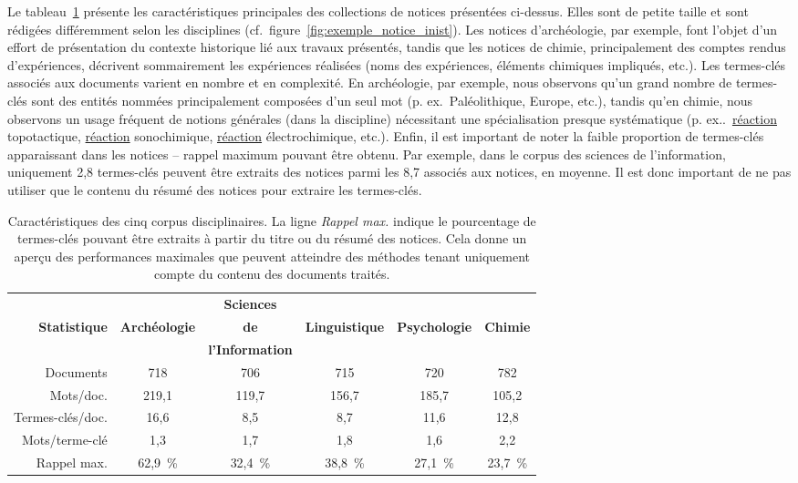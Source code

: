     Le tableau~\ref{tab:statistiques_des_corpus} présente les caractéristiques
    principales des collections de notices présentées ci-dessus. Elles sont de
    petite taille et sont rédigées différemment selon les disciplines
    (cf.~figure~\ref{fig:exemple_notice_inist}). Les notices d'archéologie, par
    exemple, font l'objet d'un effort de présentation du contexte historique lié
    aux travaux présentés, tandis que les notices de chimie, principalement des
    comptes rendus d'expériences, décrivent sommairement les expériences
    réalisées (noms des expériences, éléments chimiques impliqués, etc.). Les
    termes-clés associés aux documents varient en nombre et en complexité. En
    archéologie, par exemple, nous observons qu'un grand nombre de termes-clés
    sont des entités nommées principalement composées d'un seul mot
    (p. ex.~\og{}Paléolithique\fg{}, \og{}Europe\fg{}, etc.), tandis qu'en
    chimie, nous observons un usage fréquent de notions générales (dans la
    discipline) nécessitant une spécialisation presque systématique
    (p. ex..~\og{}\underline{réaction} topotactique\fg{},
    \og{}\underline{réaction} sonochimique\fg{}, \og{}\underline{réaction}
    électrochimique\fg{}, etc.). Enfin, il est important de noter la faible
    proportion de termes-clés apparaissant dans les notices -- rappel maximum
    pouvant être obtenu. Par exemple, dans le corpus des sciences de
    l'information, uniquement 2,8 termes-clés peuvent être extraits des notices
    parmi les 8,7 associés aux notices, en moyenne. Il est donc important de ne
    pas utiliser que le contenu du résumé des notices pour extraire les
    termes-clés.

    \begin{table}
      \centering
      \begin{tabular}{@{~}r|c@{~~}c@{~~}c@{~~}c@{~~}c@{~}}
        \toprule
        & & \textbf{Sciences} & & &\\ \textbf{Statistique} & \textbf{Archéologie} & \textbf{de} & \textbf{Linguistique} & \textbf{Psychologie} & \textbf{Chimie}\\ & & \textbf{l'Information} & & &\\
        \hline
        Documents & 718 & 706 & 715 & 720 & 782\\
        Mots/doc. & 219,1 & 119,7 & 156,7 & 185,7 & 105,2\\
        Termes-clés/doc. & 16,6 & 8,5 & 8,7 & 11,6 & 12,8\\
        Mots/terme-clé & 1,3 & 1,7 & 1,8 & 1,6 & 2,2\\
        Rappel max. & 62,9~\% & 32,4~\% & 38,8~\% & 27,1~\% & 23,7~\%\\
        \bottomrule
      \end{tabular}
      \caption{Caractéristiques des cinq corpus disciplinaires. La ligne
               \textit{Rappel max.} indique le pourcentage de termes-clés
               pouvant être extraits à partir du titre ou du résumé des notices.
               Cela donne un aperçu des performances maximales que peuvent
               atteindre des méthodes tenant uniquement compte du contenu des
               documents traités.
               \label{tab:statistiques_des_corpus}}
    \end{table}

